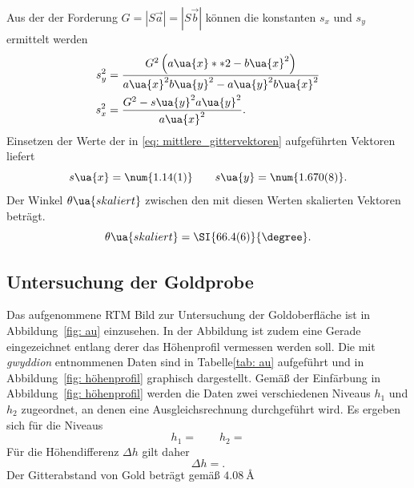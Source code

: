 Aus der der Forderung $G = \left|S \vec{a}\right| = \left|S \vec{b}\right|$ können die konstanten $s_x$ und $s_y$ ermittelt werden
\begin{align}
  s_y^2 &= \frac{G^2\left( a\ua{x}**2 - b\ua{x}^2\right)}{a\ua{x}^2 b\ua{y}^2 - a\ua{y}^2 b\ua{x}^2} \\
  s_x^2 &= \frac{G^2 - s\ua{y}^2 a\ua{y}^2}{a\ua{x}^2}.
\end{align}
Einsetzen der Werte der in \eqref{eq: mittlere_gittervektoren} aufgeführten Vektoren liefert
\begin{equation}
  s\ua{x} = \num{1.14(1)}  \qquad s\ua{y} = \num{1.670(8)}.
\end{equation}
Der Winkel $\theta\ua{skaliert}$ zwischen den mit diesen Werten skalierten Vektoren beträgt.
\begin{equation}
  \theta\ua{skaliert} = \SI{66.4(6)}{\degree}.
\end{equation}


\subsection{Untersuchung der Goldprobe}
Das aufgenommene RTM Bild zur Untersuchung der Goldoberfläche ist in Abbildung~\ref{fig: au} einzusehen.
In der Abbildung ist zudem eine Gerade eingezeichnet entlang derer das Höhenprofil vermessen werden soll.
Die mit \emph{gwyddion} entnommenen Daten sind in Tabelle\ref{tab: au} aufgeführt und in Abbildung~\ref{fig: höhenprofil}
graphisch dargestellt. Gemäß der Einfärbung in Abbildung~\ref{fig: höhenprofil} werden die Daten zwei verschiedenen
Niveaus $h_1$ und $h_2$ zugeordnet, an denen eine Ausgleichsrechnung durchgeführt wird. Es ergeben sich für die
Niveaus
\begin{equation}
  h_1 = \qquad h_2 =
\end{equation}
Für die Höhendifferenz $\Delta h$ gilt daher
\begin{equation}
  \Delta h = .
\end{equation}
Der Gitterabstand von Gold beträgt gemäß \cite{} $\SI{4.08}{\angstrom}$
